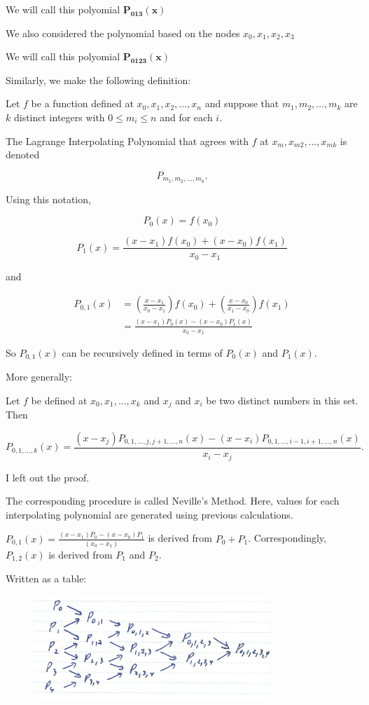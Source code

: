 We will call this polyomial $\mathbf{P_{013}(x)}$

\noindent
We also considered the polynomial based on the nodes $x_0, x_1, x_2, x_3$

We will call this polyomial $\mathbf{P_{0123}(x)}$

Similarly, we make the following definition:

Let $f$ be a function defined at $x_0, x_1, x_2, \dots, x_n$ and suppose that
$m_1, m_2, \dots ,m_k$ are $k$ distinct integers with $0\leq m_i \leq n$ and
for each $i$. 

The Lagrange Interpolating Polynomial that agrees with $f$ at 
$x_m, x_{m2}, \dots, x_{mk}$ is denoted

\[
  P_{m_1, m_2, \dots, m_k}
.\]

Using this notation,

\[
P_0(x) = f(x_0)
\]

\[
P_1(x) = \frac{(x - x_1) f(x_0) + (x - x_0) f(x_1)}{x_0 - x_1}
\]

and 


\begin{align*}
  P_{0,1}(x) &= \left( \frac{x - x_1}{x_0 - x_1} \right) f(x_0) + \left( \frac{x - x_0}{x_1 - x_0} \right) f(x_1) \\
             &= \frac{(x - x_1) P_0(x) - (x - x_0) P_1(x)}{x_0 - x_1}
\end{align*}

So $P_{0,1}(x)$ can be recursively defined in terms of $P_0(x)$ and $P_1(x)$.

More generally:

\thm Let $f$ be defined at $x_0, x_1, \dots, x_k$ and $x_j$ and $x_i$ be two
distinct numbers in this set. Then

\[
  P_{0,1,\dots,k}(x) = 
  \frac{(x - x_j) P_{0,1,\dots,j,j+1,\dots,n}(x) - (x - x_i) P_{0,1,\dots,i-1,i+1,\dots,n}(x)}{x_i - x_j}
.\]

\proof I left out the proof.

The corresponding procedure is called Neville's Method. Here, values for each 
interpolating polynomial are generated using previous calculations.

\Ex $\displaystyle P_{0,1}(x) = \frac{(x-x_1)P_0 - (x-x_0) P_1}{(x_0 - x_1)}$ is
derived from $P_0 + P_1$. Correspondingly, $P_{1,2}(x)$ is derived from $P_1$
and $P_2$.

Written as a table:

\begin{figure}[h]
    \centering
    \includegraphics[width=0.8\textwidth]{./assets/Lecture 021 Neville's Method Table.jpg}
\end{figure}

